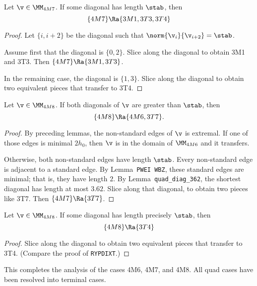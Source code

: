 \begin{lemma}[]
Let $\v\in \MM_{4M7}$.  If some diagonal has length $\stab$, then
\[
\{4M7\}\Ra \{3M1,3T3,3T4\}
\]
\end{lemma}

\begin{proof} Let $\{i,i+2\}$ be the diagonal such that $\norm{\v_i}{\v_{i+2}} = \stab$.

Assume first that the diagonal is $\{0,2\}$.
Slice along the diagonal to obtain 3M1 and 3T3.  Then $\{4M7\}\Ra\{3M1,3T3\}$.

In the remaining case, the diagonal is $\{1,3\}$.
Slice along the diagonal to obtain two equivalent pieces that transfer to 3T4.
\end{proof}

\begin{lemma}[]
Let $\v\in \MM_{4M8}$.  If both diagonals of $\v$ are greater than $\stab$, then
\[
\{4M8\}\Ra \{4M6,3T7\}.
\]
\end{lemma}

\begin{proof}
By preceding lemmas, the non-standard edges of $\v$ is extremal.  If one of those
edges is minimal $2h_0$, then $\v$ is in the domain of $\MM_{4M6}$ and it transfers.

Otherwise, both non-standard edges have length $\stab$.  Every non-standard edge
is adjacent to a standard edge.  By Lemma~{\tt PWEI WBZ},  these standard edges
are minimal; that is, they have length $2$.  By Lemma~{\tt quad\_diag\_362}, 
the shortest diagonal has length
at most $3.62$.  Slice along that diagonal, to obtain two pieces like 3T7.
Then $\{4M7\}\Ra\{3T7\}$.
\end{proof}

\begin{lemma}[]
Let $\v\in \MM_{4M8}$.  If some diagonal has length precisely $\stab$, then
\[
\{4M8\}\Ra \{3T4\}
\]
\end{lemma}

\begin{proof} 
Slice along the diagonal to obtain two equivalent pieces that transfer to 3T4.
(Compare the proof of {\tt RYPDIXT}.)
\end{proof}


This completes the analysis of the cases 4M6, 4M7, and 4M8.  
All quad cases have been resolved into terminal cases.






